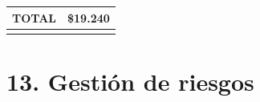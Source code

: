 \documentclass[
11pt, %
codirector, %
]{charter}
\begin{document}
\begin{table}[htpb]
\begin{tabularx}{\linewidth}{@{}|X|c|r|r|@{}}
\multicolumn{3}{|c|}{TOTAL} &
  \multicolumn{1}{c|}{\$19.240} \\ \hline
\rowcolor[HTML]{C0C0C0} 
\end{tabularx}%
\end{table}




\section{13. Gestión de riesgos}
\label{sec:riesgos}
\end{document}
